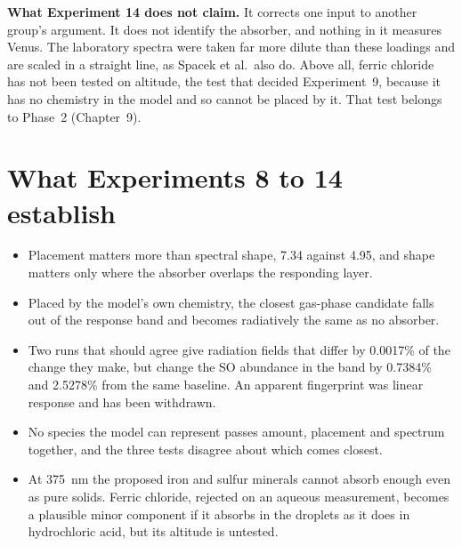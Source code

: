 \textbf{What Experiment 14 does not claim.} It corrects one input to another group's
argument. It does not identify the absorber, and nothing in it measures Venus. The
laboratory spectra were taken far more dilute than these loadings and are scaled in a
straight line, as Spacek et al.\ also do. Above all, ferric chloride has not been tested
on altitude, the test that decided Experiment~9, because it has no chemistry in the model
and so cannot be placed by it. That test belongs to Phase~2 (Chapter~9).

\section{What Experiments 8 to 14 establish}
\label{sec:e814-summary}

\begin{itemize}
  \item Placement matters more than spectral shape, 7.34 against 4.95, and shape matters
    only where the absorber overlaps the responding layer.
  \item Placed by the model's own chemistry, the closest gas-phase candidate falls out of
    the response band and becomes radiatively the same as no absorber.
  \item Two runs that should agree give radiation fields that differ by 0.0017\% of the
    change they make, but change the SO abundance in the band by 0.7384\% and 2.5278\%
    from the same baseline. An apparent
    fingerprint was linear response and has been withdrawn.
  \item No species the model can represent passes amount, placement and spectrum together,
    and the three tests disagree about which comes closest.
  \item At 375~nm the proposed iron and sulfur minerals cannot absorb enough even as
    pure solids. Ferric chloride, rejected on an aqueous measurement, becomes a plausible
    minor component if it absorbs in the droplets as it does in hydrochloric acid, but
    its altitude is untested.
\end{itemize}
